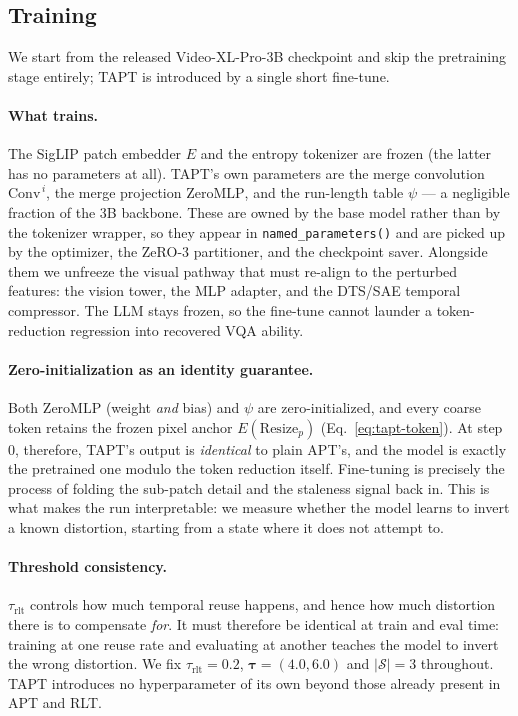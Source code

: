 \subsection{Training}
\label{sec:training}

We start from the released Video-XL-Pro-3B checkpoint and skip the pretraining
stage entirely; TAPT is introduced by a single short fine-tune.

\paragraph{What trains.}
The SigLIP patch embedder $E$ and the entropy tokenizer are frozen (the latter has
no parameters at all). TAPT's own parameters are the merge convolution
$\mathrm{Conv}^{\,i}$, the merge projection $\mathrm{ZeroMLP}$, and the run-length
table $\psi$ --- a negligible fraction of the 3B backbone. These are owned by the
base model rather than by the tokenizer wrapper, so they appear in
\texttt{named\_parameters()} and are picked up by the optimizer, the ZeRO-3
partitioner, and the checkpoint saver. Alongside them we unfreeze the visual
pathway that must re-align to the perturbed features: the vision tower, the MLP
adapter, and the DTS/SAE temporal compressor. The LLM stays frozen, so the
fine-tune cannot launder a token-reduction regression into recovered VQA ability.

\paragraph{Zero-initialization as an identity guarantee.}
Both $\mathrm{ZeroMLP}$ (weight \emph{and} bias) and $\psi$ are zero-initialized,
and every coarse token retains the frozen pixel anchor $E(\mathrm{Resize}_p)$
(Eq.~\ref{eq:tapt-token}). At step $0$, therefore, TAPT's output is
\emph{identical} to plain APT's, and the model is exactly the pretrained one
modulo the token reduction itself. Fine-tuning is precisely the process of
folding the sub-patch detail and the staleness signal back in. This is what makes
the run interpretable: we measure whether the model learns to invert a known
distortion, starting from a state where it does not attempt to.

\paragraph{Threshold consistency.}
$\tau_{\text{rlt}}$ controls how much temporal reuse happens, and hence how much
distortion there is to compensate \emph{for}. It must therefore be identical at
train and eval time: training at one reuse rate and evaluating at another teaches
the model to invert the wrong distortion. We fix $\tau_{\text{rlt}} = 0.2$,
$\bm{\tau} = (4.0, 6.0)$ and $|\mathcal{S}| = 3$ throughout. TAPT introduces no
hyperparameter of its own beyond those already present in APT and RLT.

